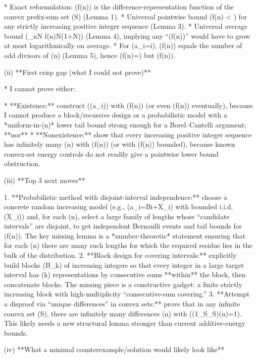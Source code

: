 * Exact reformulation: (f(n)) is the difference-representation function of the convex prefix-sum set (S) (Lemma 1).
* Universal pointwise bound (f(n) < ) for any strictly increasing positive integer sequence (Lemma 3).
* Universal average bound (\sum_{n\le N} f(n)\le N(1+\log N)) (Lemma 4), implying any “(f(n)\to\infty)” would have to grow at most logarithmically on average.
* For (a_i=i), (f(n)) equals the number of odd divisors of (n) (Lemma 5), hence (\limsup f(n)=\infty) but (f(n)\not\to\infty).

(ii) **First crisp gap (what I could not prove)**

* I cannot prove either:

  * **Existence:** construct ((a_i)) with (f(n)\to\infty) (or even (f(n)) eventually), because I cannot produce a block/recursive design or a probabilistic model with a *uniform-in-(n)* lower tail bound strong enough for a Borel–Cantelli argument; **nor**
  * **Nonexistence:** show that every increasing positive integer sequence has infinitely many (n) with (f(n)) (or with (f(n)) bounded), because known convex-set energy controls do not readily give a pointwise lower bound obstruction.

(iii) **Top 3 next moves**

1. **Probabilistic method with disjoint-interval independence:** choose a concrete random increasing model (e.g., (a_i=Bi+X_i) with bounded i.i.d. (X_i)) and, for each (n), select a large family of lengths whose “candidate intervals” are disjoint, to get independent Bernoulli events and tail bounds for (f(n)). The key missing lemma is a *number-theoretic* statement ensuring that for each (n) there are many such lengths for which the required residue lies in the bulk of the distribution.
2. **Block design for covering intervals:** explicitly build blocks (B_k) of increasing integers so that every integer in a large target interval has (\ge k) representations by consecutive sums **within** the block, then concatenate blocks. The missing piece is a constructive gadget: a finite strictly increasing block with high-multiplicity “consecutive-sum covering.”
3. **Attempt a disproof via “unique differences” in convex sets:** prove that in any infinite convex set (S), there are infinitely many differences (n) with ((1_S_S)(n)=1). This likely needs a new structural lemma stronger than current additive-energy bounds.

(iv) **What a minimal counterexample/solution would likely look like**


